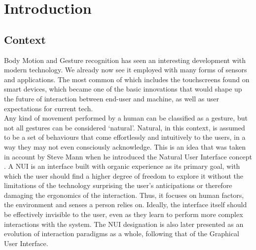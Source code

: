 \chapter{Introduction} \label{chap:intro}
\section{Context} \label{sec:intro_context}
    Body Motion and Gesture recognition has seen an interesting development with modern technology. We already now see it employed with many forms of sensors and applications. The most common of which includes the touchscreens found on smart devices, which became one of the basic innovations that would shape up the future of interaction between end-user and machine, as well as user expectations for current tech.\\
    Any kind of movement performed by a human can be classified as a gesture, but not all gestures can be considered ‘natural’. Natural, in this context, is assumed to be a set of behaviours that come effortlessly and intuitively to the users, in a way they may not even consciously acknowledge. This is an idea that was taken in account by Steve Mann when he introduced the Natural User Interface concept \cite{Mann:2001}. A NUI is an interface built with organic experience as its primary goal, with which the user should find a higher degree of freedom to explore it without the limitations of the technology surprising the user’s anticipations or therefore damaging the ergonomics of the interaction. Thus, it focuses on human factors, the environment and senses a person relies on. Ideally, the interface itself should be effectively invisible to the user, even as they learn to perform more complex interactions with the system. The NUI designation is also later presented as an evolution of interaction paradigms as a whole, following that of the Graphical User Interface\cite{NUIgroupHome}.\\

